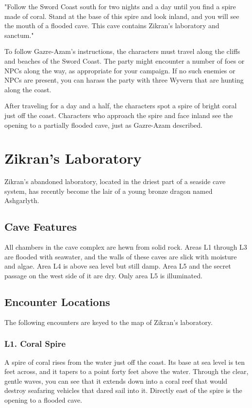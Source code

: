 \documentclass[10pt,a4paper,twoside,bg=print,twocolumn,openany,nodeprecatedcode]{dndbook}
\begin{document}
\begin{DndReadAloud}{}
"Follow the Sword Coast south for two nights and a day until you find a spire made of coral. Stand at the base of this spire and look inland, and you will see the mouth of a flooded cave. This cave contains Zikran's laboratory and sanctum."

\end{DndReadAloud}

To follow Gazre-Azam's instructions, the characters must travel along the cliffs and beaches of the Sword Coast. The party might encounter a number of foes or NPCs along the way, as appropriate for your campaign. If no such enemies or NPCs are present, you can harass the party with three Wyvern that are hunting along the coast.

After traveling for a day and a half, the characters spot a spire of bright coral just off the coast. Characters who approach the spire and face inland see the opening to a partially flooded cave, just as Gazre-Azam described.

\section{Zikran's Laboratory}
Zikran's abandoned laboratory, located in the driest part of a seaside cave system, has recently become the lair of a young bronze dragon named Ashgarlyth.

\subsection{Cave Features}
All chambers in the cave complex are hewn from solid rock. Areas L1 through L3 are flooded with seawater, and the walls of these caves are slick with moisture and algae. Area L4 is above sea level but still damp. Area L5 and the secret passage on the west side of it are dry. Only area L5 is illuminated.

\subsection{Encounter Locations}
The following encounters are keyed to the map of Zikran's laboratory.

\subsubsection{L1. Coral Spire}
\begin{DndReadAloud}{}
A spire of coral rises from the water just off the coast. Its base at sea level is ten feet across, and it tapers to a point forty feet above the water. Through the clear, gentle waves, you can see that it extends down into a coral reef that would destroy seafaring vehicles that dared sail into it. Directly east of the spire is the opening to a flooded cave.

\end{DndReadAloud}
\end{document}
